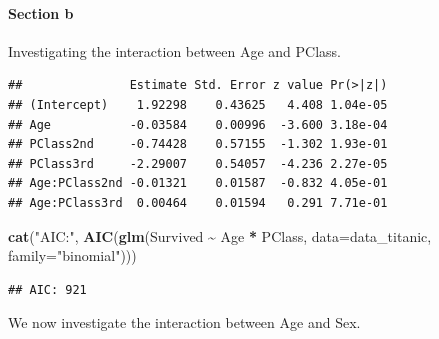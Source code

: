 \documentclass[
  11pt,
]{article}
\newenvironment{Shaded}{\begin{snugshade}}{\end{snugshade}}
\newcommand{\AttributeTok}[1]{\textcolor[rgb]{0.13,0.29,0.53}{#1}}
\newcommand{\FunctionTok}[1]{\textcolor[rgb]{0.13,0.29,0.53}{\textbf{#1}}}
\newcommand{\NormalTok}[1]{#1}
\newcommand{\SpecialCharTok}[1]{\textcolor[rgb]{0.81,0.36,0.00}{\textbf{#1}}}
\newcommand{\StringTok}[1]{\textcolor[rgb]{0.31,0.60,0.02}{#1}}
\begin{document}
\paragraph{Section b}\label{section-b}

Investigating the interaction between Age and PClass.

\begin{Shaded}
\end{Shaded}

\begin{verbatim}
##               Estimate Std. Error z value Pr(>|z|)
## (Intercept)    1.92298    0.43625   4.408 1.04e-05
## Age           -0.03584    0.00996  -3.600 3.18e-04
## PClass2nd     -0.74428    0.57155  -1.302 1.93e-01
## PClass3rd     -2.29007    0.54057  -4.236 2.27e-05
## Age:PClass2nd -0.01321    0.01587  -0.832 4.05e-01
## Age:PClass3rd  0.00464    0.01594   0.291 7.71e-01
\end{verbatim}

\begin{Shaded}
\begin{Highlighting}[]
\FunctionTok{cat}\NormalTok{(}\StringTok{"AIC:"}\NormalTok{, }\FunctionTok{AIC}\NormalTok{(}\FunctionTok{glm}\NormalTok{(Survived }\SpecialCharTok{\textasciitilde{}}\NormalTok{ Age }\SpecialCharTok{*}\NormalTok{ PClass, }\AttributeTok{data=}\NormalTok{data\_titanic, }\AttributeTok{family=}\StringTok{"binomial"}\NormalTok{)))}
\end{Highlighting}
\end{Shaded}

\begin{verbatim}
## AIC: 921
\end{verbatim}

We now investigate the interaction between Age and Sex.

\begin{Shaded}
\end{Shaded}
\end{document}

